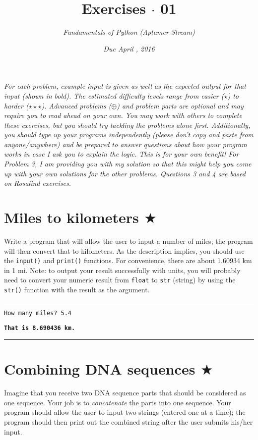 \documentclass[12pt, letterpaper]{article}
\title{Exercises $\cdot$ 01}
\author{\textit{Fundamentals of Python (Aptamer Stream)}}
\date{\textit{Due April \nth{1}, 2016}}
\begin{document}
\maketitle
\textit{For each problem, example input is given as well as the expected output for that input (shown in bold). The estimated difficulty levels range from easier ($\star$) to harder ($\star\star\star$). Advanced problems ($\oplus$) and problem parts are optional and may require you to read ahead on your own. You may work with others to complete these exercises, but you should try tackling the problems alone first. Additionally, you should type up your programs independently (please don't copy and paste from anyone/anywhere) and be prepared to answer questions about how your program works in case I ask you to explain the logic. This is for your own benefit! For Problem 3, I am providing you with my solution so that this might help you come up with your own solutions for the other problems. Questions 3 and 4 are based on Rosalind exercises.}

\section{\upshape Miles to kilometers $\bigstar$}
Write a program that will allow the user to input a number of miles; the program will then convert that to kilometers. As the description implies, you should use the \texttt{input()} and \texttt{print()} functions. For convenience, there are about 1.60934 km in 1 mi. Note: to output your result successfully with units, you will probably need to convert your numeric result from \texttt{float} to \texttt{str} (string) by using the \texttt{str()} function with the result as the argument.

\vspace{2mm}\hrule\vspace{2mm}

\texttt{How many miles? 5.4}

\texttt{\bfseries That is 8.690436 km.}

\vspace{2mm}\hrule\vspace{2mm}

\section{\upshape Combining DNA sequences $\bigstar$}
Imagine that you receive two DNA sequence parts that should be considered as one sequence. Your job is to \emph{concatenate} the parts into one sequence. Your program should allow the user to input two strings (entered one at a time); the program should then print out the combined string after the user submits his/her input.
\end{document}
